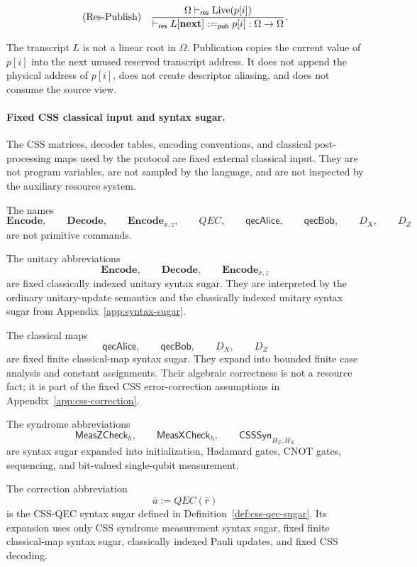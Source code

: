 \documentclass[acmsmall,screen,review,anonymous,nonacm]{acmart}
\theoremstyle{defn_style}
\begin{document}
\[
\text{\rm (Res-Publish)}
\quad
\frac{
\Omega\vdash_{\mathsf{res}}\operatorname{Live}(p[i])
}{
\vdash_{\mathsf{res}}
L[\mathbf{next}] :=_{\mathsf{pub}} p[i]
:\Omega\rightarrow
\Omega
}.
\]


The transcript \(L\) is not a linear root in \(\Omega\). Publication
copies the current value of \(p[i]\) into the next unused reserved
transcript address. It does not append the physical address of \(p[i]\), does
not create descriptor aliasing, and does not consume the source view.

\paragraph{Fixed CSS classical input and syntax sugar.}

The CSS matrices, decoder tables, encoding conventions, and classical
post-processing maps used by the protocol are fixed external classical input.
They are not program variables, are not sampled by the language, and are not
inspected by the auxiliary resource system.

The names
\[
\mathbf{Encode},
\qquad
\mathbf{Decode},
\qquad
\mathbf{Encode}_{x,z},
\qquad
QEC,
\qquad
\mathsf{qecAlice},
\qquad
\mathsf{qecBob},
\qquad
D_X,
\qquad
D_Z
\]
are not primitive commands.

The unitary abbreviations
\[
\mathbf{Encode},
\qquad
\mathbf{Decode},
\qquad
\mathbf{Encode}_{x,z}
\]
are fixed classically indexed unitary syntax sugar. They are interpreted by the
ordinary unitary-update semantics and the classically indexed unitary syntax
sugar from Appendix~\ref{app:syntax-sugar}.

The classical maps
\[
\mathsf{qecAlice},
\qquad
\mathsf{qecBob},
\qquad
D_X,
\qquad
D_Z
\]
are fixed finite classical-map syntax sugar. They expand into bounded finite
case analysis and constant assignments. Their algebraic correctness is not a
resource fact; it is part of the fixed CSS error-correction assumptions in
Appendix~\ref{app:css-correction}.

The syndrome abbreviations
\[
\mathsf{MeasZCheck}_{h},
\qquad
\mathsf{MeasXCheck}_{h},
\qquad
\mathsf{CSSSyn}_{H_Z,H_X}
\]
are syntax sugar expanded into initialization, Hadamard gates, CNOT gates,
sequencing, and bit-valued single-qubit measurement.

The correction abbreviation
\[
\bar u := QEC(\bar r)
\]
is the CSS-QEC syntax sugar defined in
Definition~\ref{def:css-qec-sugar}. Its expansion uses only CSS syndrome
measurement syntax sugar, fixed finite classical-map syntax sugar, classically
indexed Pauli updates, and fixed CSS decoding.
\end{document}
